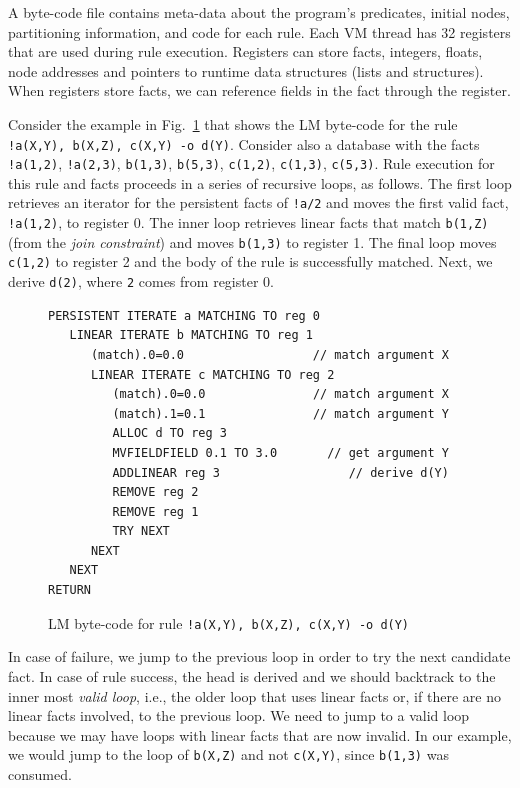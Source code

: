 \documentclass{sigplanconf}
\begin{document}
A byte-code file contains meta-data about the program's predicates,
initial nodes, partitioning information, and code for each rule. Each
VM thread has 32 registers that are used during rule
execution. Registers can store facts, integers, floats, node addresses
and pointers to runtime data structures (lists and structures). When
registers store facts, we can reference fields in the fact through the
register.

Consider the example in Fig.~\ref{fig:byte_code} that shows the LM
byte-code for the rule \texttt{!a(X,Y), b(X,Z), c(X,Y) -o
d(Y)}. Consider also a database with the
facts \texttt{!a(1,2)}, \texttt{!a(2,3)}, \texttt{b(1,3)},
\texttt{b(5,3)}, \texttt{c(1,2)}, \texttt{c(1,3)}, \texttt{c(5,3)}. Rule
execution for this rule and facts proceeds in a series of recursive
loops, as follows. The first loop retrieves an iterator for the
persistent facts of \texttt{!a/2} and moves the first valid
fact, \texttt{!a(1,2)}, to register 0. The inner loop retrieves linear
facts that match \texttt{b(1,Z)} (from the
\emph{join constraint}) and moves \texttt{b(1,3)} to register 1. The 
final loop moves \texttt{c(1,2)} to register 2 and the body of the
rule is successfully matched. Next, we derive \texttt{d(2)},
where \texttt{2} comes from register 0.

\begin{figure}[ht]
{\footnotesize
\begin{Verbatim}
PERSISTENT ITERATE a MATCHING TO reg 0
   LINEAR ITERATE b MATCHING TO reg 1
      (match).0=0.0                  // match argument X
      LINEAR ITERATE c MATCHING TO reg 2
         (match).0=0.0               // match argument X
         (match).1=0.1               // match argument Y
         ALLOC d TO reg 3
         MVFIELDFIELD 0.1 TO 3.0       // get argument Y
         ADDLINEAR reg 3                  // derive d(Y)
         REMOVE reg 2
         REMOVE reg 1
         TRY NEXT
      NEXT
   NEXT
RETURN
\end{Verbatim}
}
\caption{LM byte-code for rule \texttt{!a(X,Y), b(X,Z), c(X,Y) -o d(Y)}}
\label{fig:byte_code}
\end{figure}

In case of failure, we jump to the previous loop in order to try the
next candidate fact. In case of rule success, the head is derived and
we should backtrack to the inner most \emph{valid loop}, i.e., the
older loop that uses linear facts or, if there are no linear facts
involved, to the previous loop. We need to jump to a valid loop
because we may have loops with linear facts that are now invalid. In
our example, we would jump to the loop of \texttt{b(X,Z)} and
not \texttt{c(X,Y)}, since \texttt{b(1,3)} was consumed.
\end{document}

